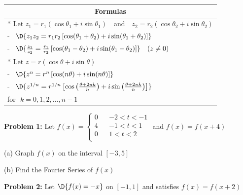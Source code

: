 \documentclass[12pt]{amsart}
\numberwithin{equation}{section}
\begin{document}
\begin{center}
	\setlength{\extrarowheight}{0.5cm}
	\begin{tabular}{| p{14cm} |}
		\hline
		\multicolumn{1}{|c|}{{\bf Formulas}} \\
		\hline
		 * Let $z_1 = r_1(\cos \theta_1 + i\sin \theta_1)$ \,\, and \,\, $z_2 = r_2(\cos \theta_2 + i\sin \theta_2)$\\
		 \qquad - \, $\D{z_1z_2 = r_1r_2\left[\cos (\theta_1+\theta_2) + i\sin (\theta_1+\theta_2)\right]}$ \\
		 \qquad - \, $\D{\frac{z_1}{z_2} = \frac{r_1}{r_2}\left[\cos (\theta_1-\theta_2) + i\sin (\theta_1-\theta_2)\right]} \quad (z\ne0)$ \\
		 * Let $z = r(\cos \theta + i\sin \theta)$ \\
		 \qquad - \, $\D{z^n = r^n\left[\cos (n\theta) + i\sin (n\theta)\right]}$ \\
		 \qquad - \, $\D{z^{1/n} = r^{1/n}\left[\cos \left(\frac{\theta+2\pi k}{n}\right) + i\sin \left(\frac{\theta+2\pi k}{n}\right)\right]}$ \\
		 \hspace{2.0cm} for \,\,$k=0,1,2,...,n-1$\\
		\hline
	\end{tabular}

\end{center}

\vspace{1.0cm}

\thispagestyle{empty}
\newpage
\thispagestyle{empty}

{\bf Problem 1:} Let \quad
$
f(x) = 
\left\{
\begin{array}{lrc}
	0 & &-2  < t <  -1\\
	4 & &-1  < t <   1\\
	0 & & 1  < t <   2\\
\end{array}
\right.
$  \quad and \quad $f(x) = f(x+4)$

\vspace{0.1cm}

(a) Graph $f(x)$ on the interval $[-3,5]$

\vspace{7.2cm}

(b) Find the Fourier Series of $f(x)$

\thispagestyle{empty}
\newpage
\thispagestyle{empty}

{\bf Problem 2:} Let \quad $\D{f(x) = -x}$ on $[-1,1]$ and satisfies $f(x) = f(x+2)$

\vspace{0.1cm}
\end{document}
